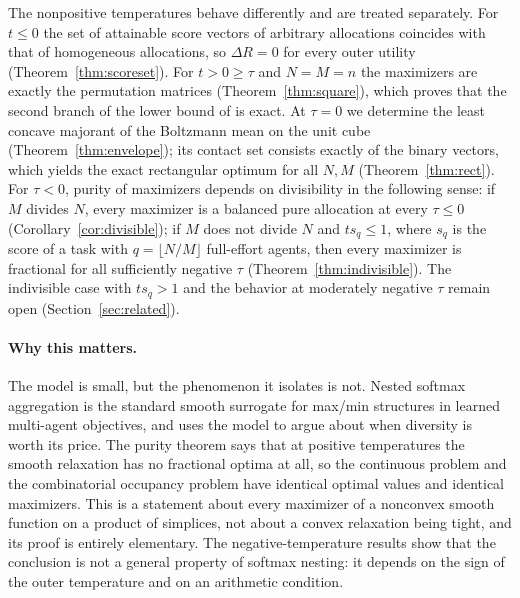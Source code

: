 \documentclass[11pt]{article}
\theoremstyle{plain}
\theoremstyle{definition}
\theoremstyle{remark}
\begin{document}
The nonpositive temperatures behave differently and are treated separately. For $t\le 0$ the set of attainable score vectors of arbitrary allocations coincides with that of homogeneous allocations, so $\Delta R=0$ for every outer utility (Theorem~\ref{thm:scoreset}). For $t>0\ge\tau$ and $N=M=n$ the maximizers are exactly the permutation matrices (Theorem~\ref{thm:square}), which proves that the second branch of the lower bound of \cite{ABPv4} is exact. At $\tau=0$ we determine the least concave majorant of the Boltzmann mean on the unit cube (Theorem~\ref{thm:envelope}); its contact set consists exactly of the binary vectors, which yields the exact rectangular optimum for all $N,M$ (Theorem~\ref{thm:rect}). For $\tau<0$, purity of maximizers depends on divisibility in the following sense: if $M$ divides $N$, every maximizer is a balanced pure allocation at every $\tau\le0$ (Corollary~\ref{cor:divisible}); if $M$ does not divide $N$ and $ts_q\le 1$, where $s_q$ is the score of a task with $q=\lfloor N/M\rfloor$ full-effort agents, then every maximizer is fractional for all sufficiently negative $\tau$ (Theorem~\ref{thm:indivisible}). The indivisible case with $ts_q>1$ and the behavior at moderately negative $\tau$ remain open (Section~\ref{sec:related}).

\paragraph{Why this matters.} The model is small, but the phenomenon it isolates is not. Nested softmax aggregation is the standard smooth surrogate for max/min structures in learned multi-agent objectives, and \cite{ABPv4} uses the model to argue about when diversity is worth its price. The purity theorem says that at positive temperatures the smooth relaxation has no fractional optima at all, so the continuous problem and the combinatorial occupancy problem have identical optimal values and identical maximizers. This is a statement about every maximizer of a nonconvex smooth function on a product of simplices, not about a convex relaxation being tight, and its proof is entirely elementary. The negative-temperature results show that the conclusion is not a general property of softmax nesting: it depends on the sign of the outer temperature and on an arithmetic condition.
\end{document}
